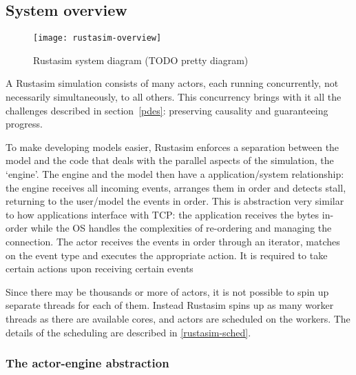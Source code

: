 \subsection{System overview} \label{rustasim-overview}

\begin{figure}[h]
\centering
\label{rustasim-overview:fig}
\texttt{[image: rustasim-overview]}
\caption{Rustasim system diagram (TODO pretty diagram)}
\end{figure}

A Rustasim simulation consists of many actors, each running concurrently, not necessarily simultaneously, to all others.
This concurrency brings with it all the challenges described in section\ \ref{pdes}: preserving causality and guaranteeing progress.

To make developing models easier, Rustasim enforces a separation between the model and the code that deals with the parallel aspects of the simulation, the `engine'.
The engine and the model then have a application/system relationship: the engine receives all incoming events, arranges them in order and detects stall, returning to the user/model the events in order.
This is abstraction very similar to how applications interface with TCP: the application receives the bytes in-order while the OS handles the complexities of re-ordering and managing the connection.
The actor receives the events in order through an iterator, matches on the event type and executes the appropriate action.
It is required to take certain actions upon receiving certain events

Since there may be thousands or more of actors, it is not possible to spin up separate threads for each of them.
Instead Rustasim spins up as many worker threads as there are available cores, and actors are scheduled on the workers.
The details of the scheduling are described in \ref{rustasim-sched}.



\subsubsection{The actor-engine abstraction} \label{rustasim-actor-engine}

